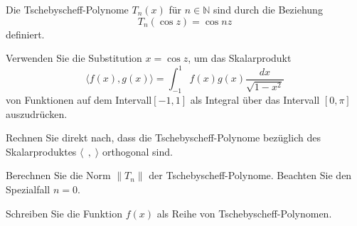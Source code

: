 Die Tschebyscheff-Polynome $T_n(x)$ für $n\in\mathbb{N}$ sind durch
die Beziehung \[
T_n(\cos z) = \cos nz
\]
definiert.
\begin{teilaufgaben}
\item
Verwenden Sie die Substitution $x=\cos z$, um das Skalarprodukt
\[
\langle f(x),g(x)\rangle
=
\int_{-1}^1 f(x)g(x) \frac{dx}{\sqrt{1-x^2}}
\]
von Funktionen auf dem Intervall$[-1,1]$
als Integral über das Intervall $[0,\pi]$ auszudrücken.
\item
Rechnen Sie direkt nach, dass die Tschebyscheff-Polynome bezüglich des
Skalarproduktes
\(
\langle \;\,,\;\rangle
\)
orthogonal sind.
\item
Berechnen Sie die Norm $\|T_n\|$ der Tschebyscheff-Polynome.
Beachten Sie den Spezialfall $n=0$.
\item
Schreiben Sie die Funktion $f(x)$ als Reihe von Tschebyscheff-Polynomen.
\end{teilaufgaben}

